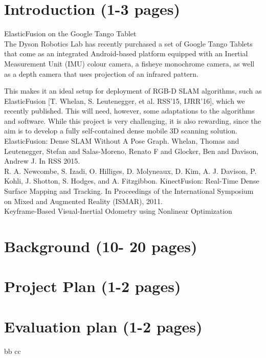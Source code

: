 \documentclass[12pt,twoside]{article}
\begin{document}






\section{Introduction (1-3 pages)}
ElasticFusion on the Google Tango Tablet\\
The Dyson Robotics Lab has recently purchased a set of Google Tango Tablets that come as an integrated Android-based platform equipped with an Inertial Measurement Unit (IMU) colour camera, a fisheye monochrome camera, as well as a depth camera that uses projection of an infrared pattern. 

This makes it an ideal setup for deployment of RGB-D SLAM algorithms, such as ElasticFusion [T. Whelan, S. Leutenegger, et al. RSS’15, IJRR'16], which we recently published. This will need, however, some adaptations to the algorithms and software. While this project is very challenging, it is also rewarding, since the aim is to develop a fully self-contained dense mobile 3D scanning solution.\\

ElasticFusion: Dense SLAM Without A Pose Graph. Whelan, Thomas and Leutenegger, Stefan and Salas-Moreno, Renato F and Glocker, Ben and Davison, Andrew J. In RSS 2015.\\

R. A. Newcombe, S. Izadi, O. Hilliges, D. Molyneaux,
D. Kim, A. J. Davison, P. Kohli, J. Shotton, S. Hodges,
and A. Fitzgibbon. KinectFusion: Real-Time Dense
Surface Mapping and Tracking. In Proceedings of
the International Symposium on Mixed and Augmented
Reality (ISMAR), 2011.\\
Keyframe-Based Visual-Inertial Odometry using Nonlinear Optimization\\

\section{Background (10- 20 pages)}
\section{Project Plan (1-2 pages)}
\section{Evaluation plan (1-2 pages)}

bb \cite{whelan2015elasticfusion}
cc \cite{leutenegger2015keyframe}



\end{document}
